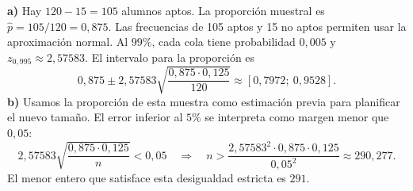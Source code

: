\textbf{a)} Hay $120-15=105$ alumnos aptos. La proporción muestral es $\hat p=105/120=0{,}875$. Las frecuencias de 105 aptos y 15 no aptos permiten usar la aproximación normal. Al $99\%$, cada cola tiene probabilidad $0{,}005$ y $z_{0{,}995}\approx2{,}57583$. El intervalo para la proporción es
\[
 0{,}875\pm2{,}57583\sqrt{\frac{0{,}875\cdot0{,}125}{120}}
 \approx\boxed{[0{,}7972;\ 0{,}9528]}.
\]
\textbf{b)} Usamos la proporción de esta muestra como estimación previa para planificar el nuevo tamaño. El error inferior al $5\%$ se interpreta como margen menor que $0{,}05$:
\[
 2{,}57583\sqrt{\frac{0{,}875\cdot0{,}125}{n}}<0{,}05
 \quad\Longrightarrow\quad
 n>\frac{2{,}57583^2\cdot0{,}875\cdot0{,}125}{0{,}05^2}
 \approx290{,}277.
\]
El menor entero que satisface esta desigualdad estricta es $\boxed{291}$.
